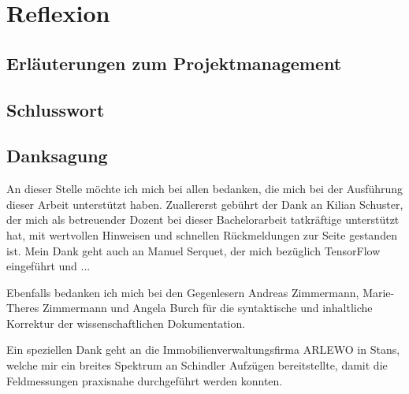 \chapter{Reflexion}
\label{Reflexion}


\section{Erläuterungen zum Projektmanagement}



\section{Schlusswort}



\section{Danksagung}

An dieser Stelle möchte ich mich bei allen bedanken, die mich bei der Ausführung dieser
Arbeit unterstützt haben. Zuallererst gebührt der Dank an Kilian Schuster, der mich als betreuender Dozent bei dieser Bachelorarbeit tatkräftige unterstützt hat, mit wertvollen Hinweisen und schnellen Rückmeldungen zur Seite gestanden ist. Mein Dank geht auch an Manuel Serquet, der mich bezüglich TensorFlow eingeführt und ...


Ebenfalls bedanken ich mich bei den Gegenlesern Andreas Zimmermann, Marie-Theres Zimmermann
und Angela Burch für die syntaktische und inhaltliche Korrektur der wissenschaftlichen
Dokumentation.

Ein speziellen Dank geht an die Immobilienverwaltungsfirma ARLEWO in Stans, welche mir ein breites Spektrum an Schindler Aufzügen bereitstellte, damit die Feldmessungen praxisnahe durchgeführt werden konnten.